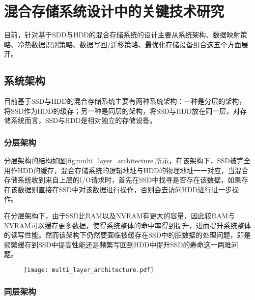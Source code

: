 
\chapter{混合存储系统设计中的关键技术研究}
\label{chap:key_tech}

目前，针对基于SDD与HDD的混合存储系统的设计主要从系统架构、数据映射策略、冷热数据识别策略、数据写回/迁移策略、最优化存储设备组合这五个方面展开。

\section{系统架构}

目前基于SSD与HDD的混合存储系统主要有两种系统架构：一种是分层的架构，将SSD作为HDD的缓存；另一种是同层的架构，将SSD与HDD放在同一层，对存储系统而言，SSD与HDD是相对独立的存储设备。

\subsection{分层架构}

分层架构的结构如图\ref{fig:multi_layer_architecture}所示，在该架构下，SSD被完全用作HDD的缓存，混合存储系统的逻辑地址与HDD的物理地址一一对应，当混合存储系统收到来自上层的I/O请求时，首先在SSD中找寻是否存在该数据，如果存在该数据则直接在SSD中对该数据进行操作，否则会去访问HDD进行进一步操作。

在分层架构下，由于SSD比RAM以及NVRAM有更大的容量，因此较RAM与NVRAM可以缓存更多数据，使得系统整体的命中率得到提升，进而提升系统整体的读写性能。然而该架构下仍然要面临被缓存在SSD中的脏数据的处理问题，即是频繁缓存到SSD中提高性能还是频繁写回到HDD中提升SSD的寿命这一两难问题。

\begin{figure}[!htp]
    \centering
    \texttt{[image: multi\_layer\_architecture.pdf]}
\end{figure}

\subsection{同层架构}

